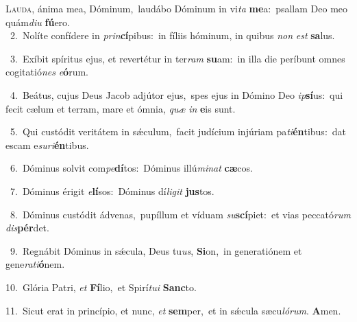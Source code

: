 \lettrine{\initial\textcolor{\initialcolor}{L}}{auda,} ánima mea, Dóminum,~\dagger laudábo Dóminum in vi\textit{ta} \textbf{me}\-a:~\star psallam Deo meo quám\-\textit{di}\-\textit{u} \textbf{fú}\-ero.\\
{\numbfont\textcolor{\numbcolor}{~2.}}~Nolíte confídere in \textit{prin}\-\textbf{cí}pibus:~\star in fíliis hóminum, in quibus \textit{non} \textit{est} \textbf{sa}\-lus.\par
{\numbfont\textcolor{\numbcolor}{~3.}}~Exíbit spíritus ejus, et revertétur in ter\textit{ram} \textbf{su}\-am:~\star in illa die períbunt omnes cogitatió\textit{nes} \textit{e}\-\textbf{ó}rum.\par
{\numbfont\textcolor{\numbcolor}{~4.}}~Beátus, cujus Deus Jacob adjútor ejus,~\dagger spes ejus in Dómino Deo \textit{ip}\-\textbf{sí}us:~\star qui fecit cælum et terram, mare et ómnia, \textit{quæ} \textit{in} \textbf{e}\-is sunt.\par
{\numbfont\textcolor{\numbcolor}{~5.}}~Qui custódit veritátem in sǽculum,~\dagger facit judícium injúriam pa\-\textit{ti}\-\textbf{én}tibus:~\star dat escam e\-\textit{su}\-\textit{ri}\textbf{én}tibus.\par
{\numbfont\textcolor{\numbcolor}{~6.}}~Dóminus solvit com\-\textit{pe}\-\textbf{dí}tos:~\star Dóminus illú\-\textit{mi}\-\textit{nat} \textbf{cæ}\-cos.\par
{\numbfont\textcolor{\numbcolor}{~7.}}~Dóminus érigit \textit{e}\-\textbf{lí}sos:~\star Dóminus dí\-\textit{li}\-\textit{git} \textbf{jus}\-tos.\par
{\numbfont\textcolor{\numbcolor}{~8.}}~Dóminus custódit ádvenas,~\dagger pupíllum et víduam \textit{su}\-\textbf{scí}piet:~\star et vias peccató\textit{rum} \textit{dis}\-\textbf{pér}det.\par
{\numbfont\textcolor{\numbcolor}{~9.}}~Regnábit Dóminus in sǽcula, Deus tu\-\textit{us}\-, \textbf{Si}\-on,~\star in generatiónem et gene\-\textit{ra}\-\textit{ti}\textbf{ó}nem.\par
{\numbfont\textcolor{\numbcolor}{10.}}~Glória Patri, \textit{et} \textbf{Fí}\-lio,~\star et Spirí\-\textit{tu}\-\textit{i} \textbf{Sanc}\-to.\par
{\numbfont\textcolor{\numbcolor}{11.}}~Sicut erat in princípio, et nunc, \textit{et} \textbf{sem}\-per,~\star et in sǽcula sæcu\-\textit{ló}\-\textit{rum}. \textbf{A}\-men.\par
